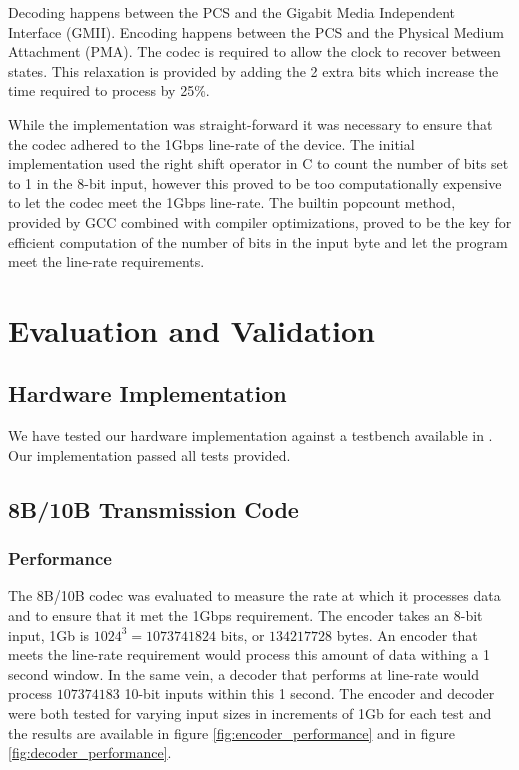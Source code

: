 \documentclass[conference]{IEEEtran}
\begin{document}
Decoding happens between the PCS and the Gigabit Media Independent Interface (GMII). Encoding happens between the PCS and the Physical Medium  Attachment (PMA). The codec is required to allow the clock to recover between states. This relaxation is provided by adding the 2 extra bits which increase the time required to process by 25\%.

While the implementation was straight-forward it was necessary to ensure that the codec adhered to the 1Gbps line-rate of the device. The initial implementation used the right shift operator in C to count the number of bits set to 1 in the 8-bit input, however this proved to be too computationally expensive to let the codec meet the 1Gbps line-rate. The builtin popcount method, provided by GCC combined with compiler optimizations, proved to be the key for efficient computation of the number of bits in the input byte and let the program meet the line-rate requirements.

\section{Evaluation and Validation}

\subsection{Hardware Implementation}

  We have tested our hardware implementation against a testbench available in \cite{testbench}. Our implementation passed all tests provided.

\subsection{8B/10B Transmission Code}

\subsubsection{Performance}

The 8B/10B codec was evaluated to measure the rate at which it processes data and to ensure that it met the 1Gbps requirement. The encoder takes an 8-bit input, 1Gb is $1024^3 = 1073741824$ bits, or $134217728$ bytes. An encoder that meets the line-rate requirement would process this amount of data withing a 1 second window. In the same vein, a decoder that performs at line-rate would process $107374183$ 10-bit inputs within this 1 second. The encoder and decoder were both tested for varying input sizes in increments of 1Gb for each test and the results are available in figure \ref{fig:encoder_performance} and in figure \ref{fig:decoder_performance}.
\end{document}
